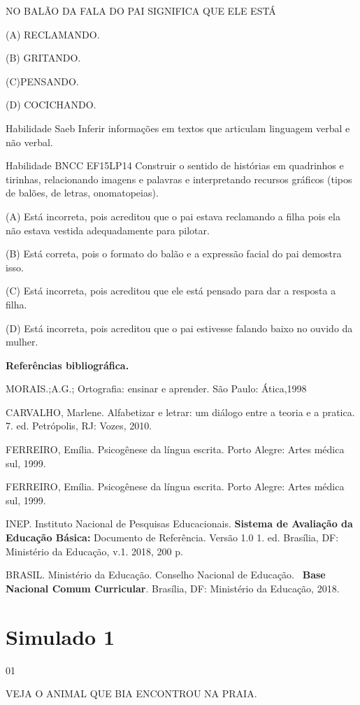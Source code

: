 {{{{{{NO BALÃO DA FALA DO PAI SIGNIFICA QUE ELE ESTÁ

(A) RECLAMANDO.

(B) GRITANDO.

(C)PENSANDO.

(D) COCICHANDO.

Habilidade Saeb Inferir informações em textos que articulam linguagem
verbal e não verbal.

Habilidade BNCC EF15LP14 Construir o sentido de histórias em quadrinhos
e tirinhas, relacionando imagens e palavras e interpretando recursos
gráficos (tipos de balões, de letras, onomatopeias).

(A) Está incorreta, pois acreditou que o pai estava reclamando a filha
pois ela não estava vestida adequadamente para pilotar.

(B) Está correta, pois o formato do balão e a expressão facial do pai
demostra isso.

(C) Está incorreta, pois acreditou que ele está pensado para dar a
resposta a filha.

(D) Está incorreta, pois acreditou que o pai estivesse falando baixo no
ouvido da mulher.

\textbf{Referências bibliográfica.}

MORAIS.;A.G.; Ortografia: ensinar e aprender. São Paulo: Ática,1998

CARVALHO, Marlene. Alfabetizar e letrar: um diálogo entre a teoria e a
pratica. 7. ed. Petrópolis, RJ: Vozes, 2010.

FERREIRO, Emília. Psicogênese da língua escrita. Porto Alegre: Artes
médica sul, 1999.

FERREIRO, Emília. Psicogênese da língua escrita. Porto Alegre: Artes
médica sul, 1999.

INEP. Instituto Nacional de Pesquisas Educacionais. \textbf{Sistema de
Avaliação da Educação Básica:} Documento de Referência. Versão 1.0 1.
ed. Brasília, DF: Ministério da Educação, v.1. 2018, 200 p.

BRASIL. Ministério da Educação. Conselho Nacional de Educação.~
\textbf{Base Nacional Comum Curricular}. Brasília, DF: Ministério da
Educação, 2018.

\chapter{Simulado 1}

\num{01}

VEJA O ANIMAL QUE BIA ENCONTROU NA PRAIA.

}}}}}}
